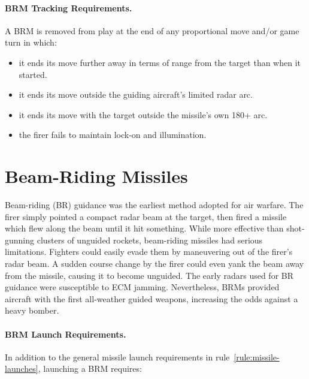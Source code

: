 {\paragraph{BRM Tracking Requirements.} A BRM is removed from play at the end of any proportional move and/or game turn in which:

\begin{itemize}

    \item it ends its move further away in terms of range from the target than when it started.

    \item it ends its move outside the guiding aircraft's limited radar arc.

    \item it ends its move with the target outside the missile's own 180+ arc.

    \item the firer fails to maintain lock-on and illumination.

\end{itemize}

}{

\section{Beam-Riding Missiles}
\label{rule:beam-riding-missiles}

Beam-riding (BR) guidance was the earliest method adopted for air warfare. The firer simply pointed a compact radar beam at the target, then fired a missile which flew along the beam until it hit something. While more effective than shot-gunning clusters of unguided rockets, beam-riding missiles had serious limitations. Fighters could easily evade them by maneuvering out of the firer's radar beam. A sudden course change by the firer could even yank the beam away from the missile, causing it to become unguided. The early radars used for BR guidance were susceptible to ECM jamming. Nevertheless, BRMs provided aircraft with the first all-weather guided weapons, increasing the odds against a heavy bomber.

\paragraph{BRM Launch Requirements.}
\label{rule:brm-launch-requirements}

In addition to the general missile launch requirements in rule~\ref{rule:missile-launches}, launching a BRM requires:

}
